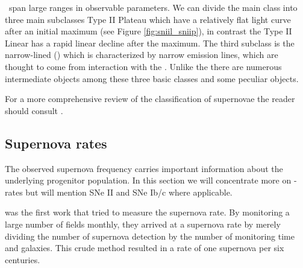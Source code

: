 \sneii\ span large ranges in observable parameters. We can divide the main class into three main subclasses Type II Plateau \citet[\sniip][]{1979A&A....72..287B} which have a relatively flat light curve after an initial maximum (see Figure \ref{fig:sniil_sniip}), in contrast the Type II Linear \cite[\sniil][]{1990MNRAS.244..269S} has a rapid linear decline after the maximum. The third subclass is the narrow-lined \snii (\sniin) which is characterized by narrow emission lines, which are thought to come from interaction with the \csm. Unlike the \sneia there are numerous intermediate objects among these three basic classes and some peculiar objects.


For a more comprehensive review of the classification of supernovae the reader should consult \citet{2003LNP...598...21T, 2007AIPC..937..187T}.

\subsection{Supernova rates} 
The observed supernova frequency carries important information about the underlying progenitor population. In this section we will concentrate more on \sneia-rates but will mention SNe II and SNe Ib/c where applicable.

\citet{1938ApJ....88..529Z} was the first work that tried to measure the supernova rate. By monitoring a large number of fields monthly, they arrived at a supernova rate by merely dividing the number of supernova detection by the number of monitoring time and galaxies. This crude method resulted in a rate of one supernova per six centuries. 


